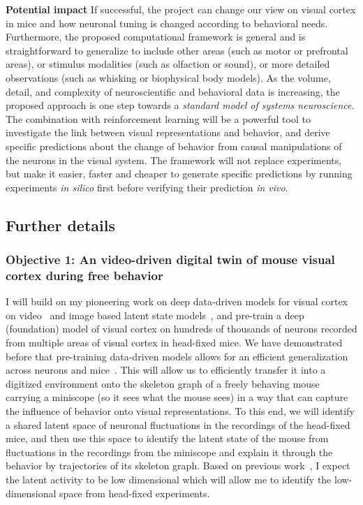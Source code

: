 \documentclass[COG,11pt]{ercgrant}
\begin{document}
\textbf{Potential impact}
If successful, the project can change our view on visual cortex in mice and how neuronal tuning is changed according to behavioral needs. 
Furthermore, the proposed computational framework is general and is straightforward to generalize to include other areas (such as motor or prefrontal areas), or stimulus modalities (such as olfaction or sound), or more detailed observations (such as whisking or biophysical body models). 
As the volume, detail, and complexity of neuroscientific and behavioral data is increasing, the proposed approach is one step towards a \textit{standard model of systems neuroscience}.
The combination with reinforcement learning will be a powerful tool to investigate the link between visual representations and behavior, and derive specific predictions about the change of behavior from causal manipulations of the neurons in the visual system.
The framework will not replace experiments, but make it easier, faster and cheaper to generate specific predictions by running experiments \textit{in silico} first before verifying their prediction \textit{in vivo}.

\subsection{Further details}
\subsubsection{Objective 1: An video-driven digital twin of mouse visual cortex during free behavior\hfill{}}
I will build on my pioneering work on deep data-driven models for visual cortex on video~\parencite{Sinz2018-sk} and image based latent state models~\parencite{Bashiri2021-or}, and pre-train a deep (foundation) model of visual cortex on hundreds of thousands of neurons recorded from multiple areas of visual cortex in head-fixed mice.
We have demonstrated before that pre-training data-driven models allows for an efficient generalization across neurons and mice~\parencite{Lurz2020-ua}. 
This will allow us to efficiently transfer it into a digitized environment onto the skeleton graph of a freely behaving mouse carrying a miniscope (so it sees what the mouse sees) in a way that can capture the influence of behavior onto visual representations. 
To this end, we will identify a shared latent space of neuronal fluctuations in the recordings of the head-fixed mice, and then use this space to identify the latent state of the mouse from fluctuations in the recordings from the miniscope and explain it through the behavior by trajectories of its skeleton graph.
Based on previous work~\parencite{Musall2019-kd, Stringer2019-lt}, I expect the latent activity to be low dimensional which will allow me to identify the low-dimensional space from head-fixed experiments. 
\end{document}
